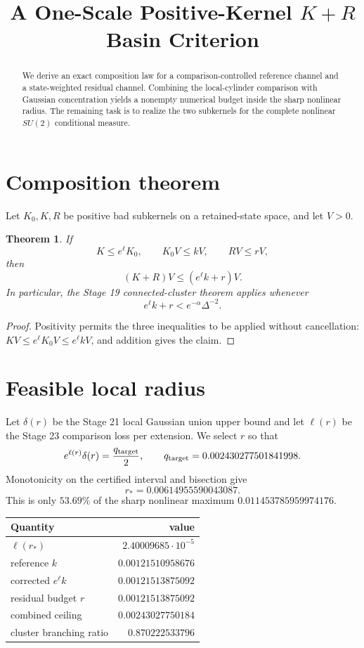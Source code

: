 \documentclass[11pt]{article}
\title{A One-Scale Positive-Kernel $K+R$ Basin Criterion}
\author{}
\date{}
\newtheorem{theorem}{Theorem}
\begin{document}
\maketitle

\begin{abstract}
We derive an exact composition law for a comparison-controlled reference
channel and a state-weighted residual channel.  Combining the local-cylinder
comparison with Gaussian concentration yields a nonempty numerical budget
inside the sharp nonlinear radius.  The remaining task is to realize the two
subkernels for the complete nonlinear $SU(2)$ conditional measure.
\end{abstract}

\section{Composition theorem}
Let $K_0,K,R$ be positive bad subkernels on a retained-state space, and let
$V>0$.

\begin{theorem}
If
\[
 K\le e^\ell K_0,
 \qquad K_0V\le kV,
 \qquad RV\le rV,
\]
then
\[
 (K+R)V\le (e^\ell k+r)V.
\]
In particular, the Stage 19 connected-cluster theorem applies whenever
\[
 e^\ell k+r<e^{-\alpha}\Delta^{-2}.
\]
\end{theorem}
\begin{proof}
Positivity permits the three inequalities to be applied without cancellation:
$KV\le e^\ell K_0V\le e^\ell kV$, and addition gives the claim.
\end{proof}

\section{Feasible local radius}
Let $\delta(r)$ be the Stage 21 local Gaussian union upper bound and let
$\ell(r)$ be the Stage 23 comparison loss per extension.  We select $r$ so
that
\[
 e^{\ell(r)}\delta(r)=\frac{q_{\rm target}}2,
 \qquad q_{\rm target}=0.002430277501841998.
\]
Monotonicity on the certified interval and bisection give
\[
 r_*=0.00614955590043087.
\]
This is only $53.69\%$ of the sharp nonlinear maximum
$0.011453785959974176$.

\begin{center}
\begin{tabular}{lr}
\toprule
Quantity & value\\
\midrule
$\ell(r_*)$ & $2.40009685\cdot10^{-5}$\\
reference $k$ & $0.00121510958676$\\
corrected $e^\ell k$ & $0.00121513875092$\\
residual budget $r$ & $0.00121513875092$\\
combined ceiling & $0.00243027750184$\\
cluster branching ratio & $0.870222533796$\\
\bottomrule
\end{tabular}
\end{center}
\end{document}
